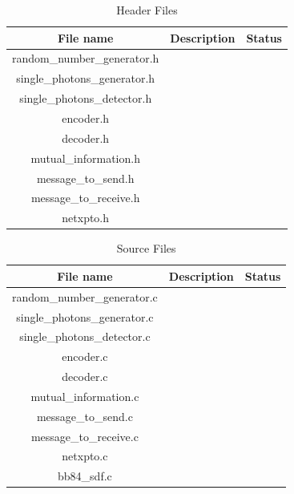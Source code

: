 \begin{table}[hbt]
\centering
\caption{Header Files}
\label{tb:signals}
\begin{tabular}{|c|c|c|}
\hline
\textbf{File name}              & \textbf{Description} & \textbf{Status} \\ \hline
random\_number\_generator.h       &                      &                 \\ \hline
single\_photons\_generator.h      &                      &                 \\ \hline
single\_photons\_detector.h       &                      &                 \\ \hline
encoder.h                       &                      &                 \\ \hline
decoder.h                       &                      &                 \\ \hline
mutual\_information.h            &                      &                 \\ \hline
message\_to\_send.h               &                      &                 \\ \hline
message\_to\_receive.h            &                      &                 \\ \hline
netxpto.h                       &                      &                 \\ \hline
\end{tabular}
\end{table}

\begin{table}[hbt]
\centering
\caption{Source Files}
\label{tb:signals}
\begin{tabular}{|c|c|c|}
\hline
\textbf{File name}              & \textbf{Description} & \textbf{Status} \\ \hline
random\_number\_generator.c       &                      &                 \\ \hline
single\_photons\_generator.c      &                      &                 \\ \hline
single\_photons\_detector.c       &                      &                 \\ \hline
encoder.c                       &                      &                 \\ \hline
decoder.c                       &                      &                 \\ \hline
mutual\_information.c            &                      &                 \\ \hline
message\_to\_send.c               &                      &                 \\ \hline
message\_to\_receive.c            &                      &                 \\ \hline
netxpto.c                       &                      &                 \\ \hline
bb84\_sdf.c                       &                      &                 \\ \hline
\end{tabular}
\end{table}